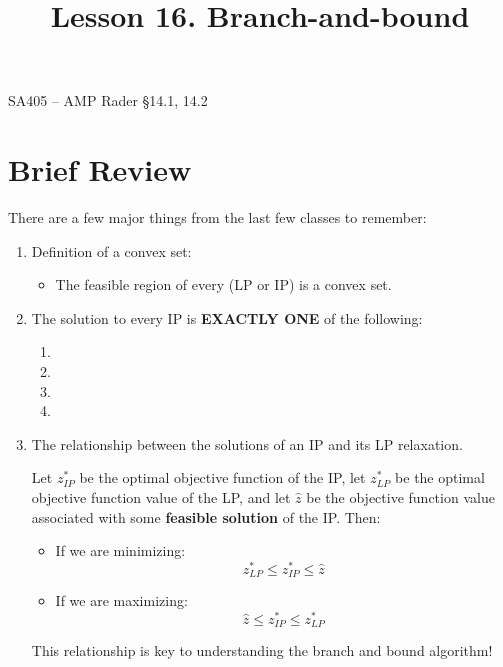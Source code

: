 \documentclass[11pt]{article}
\makeatletter
\theoremstyle{definition}
\renewcommand{\maketitle}{
  \noindent SA405 -- AMP \hfill Rader \S 14.1, 14.2  \\

  \begin{center}\Large{\textbf{\@title}}\end{center}
}
\makeatother
\begin{document}
  
\title{Lesson 16.  Branch-and-bound}

\maketitle

\section{Brief Review}

There are a few major things from the last few classes to remember:
	\begin{enumerate}
	\item Definition of a convex set: \vspace{2cm}
		\begin{itemize}
		\item The feasible region of every (LP or IP) is a convex set.
		\end{itemize}
		\vfill
	\item The solution to every IP is \textbf{EXACTLY ONE} of the following:
		\begin{enumerate}
		\item \phantom{1}
		\item \phantom{1}
		\item \phantom{1}
		\item \phantom{1}
		\end{enumerate}
		\vfill
	\item The relationship between the solutions of an IP and its LP relaxation.

\begin{tcolorbox}
Let $z^*_{IP}$ be the optimal objective function of the IP, let $z^*_{LP}$ be the optimal objective function value of the LP, and let $\hat{z}$ be the objective function value associated with some \textbf{feasible solution} of the IP. Then:
	\begin{itemize}
	\item If we are minimizing:
	\[
	z^*_{LP} \leq z^*_{IP} \leq \hat{z}
	\]
	\item If we are maximizing:
	\[
	\hat{z} \leq z^*_{IP} \leq z^*_{LP}
	\]
	\end{itemize}
\end{tcolorbox}	
This relationship is key to understanding the branch and bound algorithm!	
	\end{enumerate}

\newpage
\end{document}
